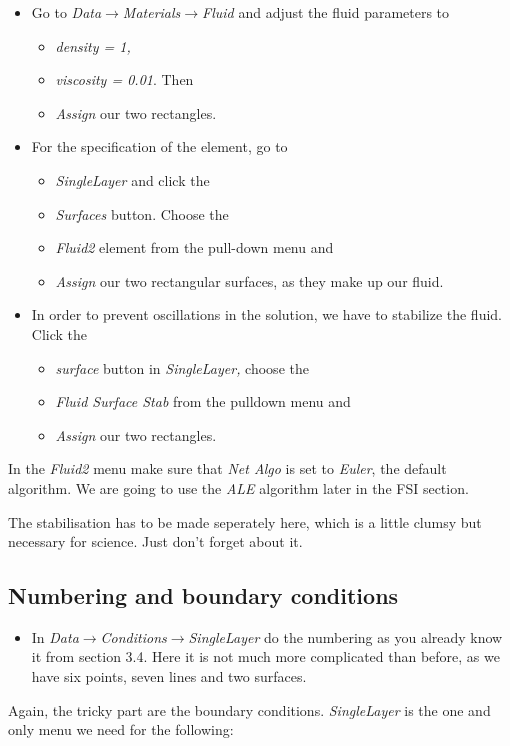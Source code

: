 \begin{itemize}
\item Go to \emph{Data$\to$Materials$\to$Fluid} and adjust the fluid parameters
to 

\begin{itemize}
\item \emph{density = 1, }
\item \emph{viscosity = 0.01}. Then 
\item \emph{Assign} our two rectangles. 
\end{itemize}
\item For the specification of the element, go to 

\begin{itemize}
\item \emph{SingleLayer} and click the 
\item \emph{Surfaces} button. Choose the 
\item \emph{Fluid2} element from the pull-down menu and 
\item \emph{Assign} our two rectangular surfaces, as they make up our fluid.
\end{itemize}
\item In order to prevent oscillations in the solution, we have to stabilize
the fluid. Click the 

\begin{itemize}
\item \emph{surface} button in \emph{SingleLayer,} choose the 
\item \emph{Fluid Surface Stab} from the pulldown menu and
\item \emph{Assign} our two rectangles.
\end{itemize}
\end{itemize}
In the \emph{Fluid2} menu make sure that \emph{Net Algo} is set to
\emph{Euler}, the default algorithm. We are going to use the \emph{ALE}
algorithm later in the FSI section.

The stabilisation has to be made seperately here, which is a little
clumsy but necessary for science. Just don't forget about it.


\subsection{Numbering and boundary conditions}

\begin{itemize}
\item In \emph{Data$\to$Conditions$\to$SingleLayer} do the numbering as
you already know it from section 3.4. Here it is not much more complicated
than before, as we have six points, seven lines and two surfaces.
\end{itemize}
Again, the tricky part are the boundary conditions. \emph{SingleLayer}
is the one and only menu we need for the following:

